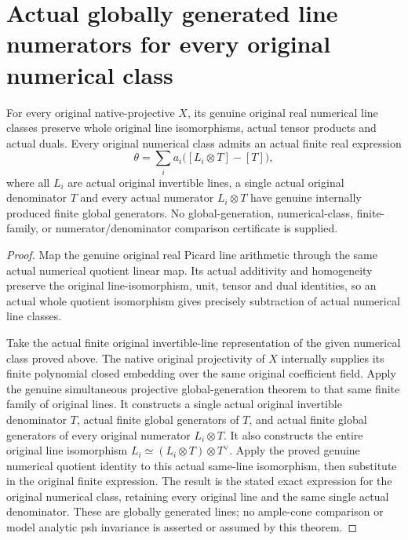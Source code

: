 \section{Actual globally generated line numerators for every original numerical class}
\label{sec:native-numerical-generated-line-sums}

\begin{theorem}
\label{thm:native-numerical-generated-line-sums}
\leanok
{}
For every original native-projective $X$, its genuine original real
numerical line classes preserve whole original line isomorphisms,
actual tensor products and actual duals. Every original numerical
class admits an actual finite real expression
\[
 \theta=\sum_i a_i\bigl([L_i\otimes T]-[T]\bigr),
\]
where all $L_i$ are actual original invertible lines, a single
actual original denominator $T$ and every actual numerator
$L_i\otimes T$ have genuine internally produced finite global
generators. No global-generation, numerical-class, finite-family,
or numerator/denominator comparison certificate is supplied.
\end{theorem}

\begin{proof}
Map the genuine original real Picard line arithmetic through the
same actual numerical quotient linear map. Its actual additivity
and homogeneity preserve the original line-isomorphism, unit,
tensor and dual identities, so an actual whole quotient
isomorphism gives precisely subtraction of actual numerical
line classes.

Take the actual finite original invertible-line representation
of the given numerical class proved above. The native original
projectivity of $X$ internally supplies its finite polynomial
closed embedding over the same original coefficient field.
Apply the genuine simultaneous projective global-generation
theorem to that same finite family of original lines. It
constructs a single actual original invertible denominator $T$,
actual finite global generators of $T$, and actual finite global
generators of every original numerator $L_i\otimes T$. It also
constructs the entire original line isomorphism
$L_i\simeq(L_i\otimes T)\otimes T^\vee$. Apply the proved genuine
numerical quotient identity to this actual same-line
isomorphism, then substitute in the original finite expression.
The result is the stated exact expression for the original
numerical class, retaining every original line and the same
single actual denominator. These are globally generated lines;
no ample-cone comparison or model analytic psh invariance is
asserted or assumed by this theorem.
\end{proof}

